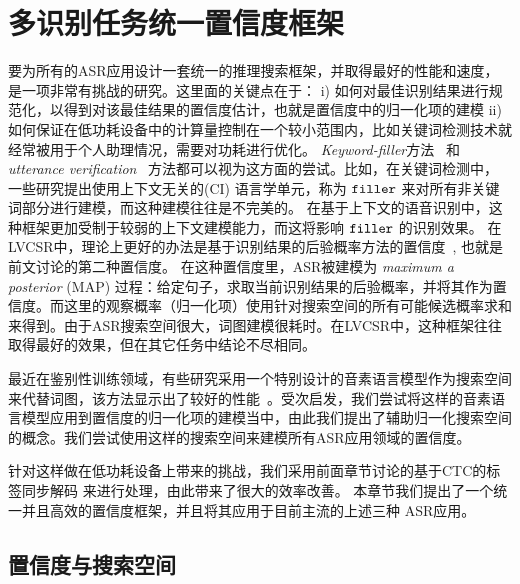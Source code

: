 
\section{多识别任务统一置信度框架}
\label{chap:unify}

要为所有的ASR应用设计一套统一的推理搜索框架，并取得最好的性能和速度，是一项非常有挑战的研究。这里面的关键点在于： i) 如何对最佳识别结果进行规范化，以得到对该最佳结果的置信度估计，也就是置信度中的归一化项的建模
    ii) 如何保证在低功耗设备中的计算量控制在一个较小范围内，比如关键词检测技术就经常被用于个人助理情况，需要对功耗进行优化。
    {\em Keyword-filler}方法~\cite{young1994detecting} 和 {\em utterance verification}~\cite{rose1995training} 方法都可以视为这方面的尝试。比如，在关键词检测中，一些研究提出使用上下文无关的(CI) 语言学单元，称为 $\tt filler$ 来对所有非关键词部分进行建模，而这种建模往往是不完美的。
    在基于上下文的语音识别中，这种框架更加受制于较弱的上下文建模能力，而这将影响 $\tt filler$ 的识别效果。
    在LVCSR中，理论上更好的办法是基于识别结果的后验概率方法的置信度~\cite{wessel2001confidence}, 也就是前文讨论的第二种置信度。 在这种置信度里，ASR被建模为  {\em maximum a posterior} (MAP) 过程：给定句子，求取当前识别结果的后验概率，并将其作为置信度。而这里的观察概率（归一化项）使用针对搜索空间的所有可能候选概率求和来得到。由于ASR搜索空间很大，词图建模很耗时。在LVCSR中，这种框架往往取得最好的效果，但在其它任务中结论不尽相同。

    最近在鉴别性训练领域，有些研究采用一个特别设计的音素语言模型作为搜索空间来代替词图，该方法显示出了较好的性能~\cite{chen2006advances}\cite{povey2016purely}。受次启发，我们尝试将这样的音素语言模型应用到置信度的归一化项的建模当中，由此我们提出了辅助归一化搜索空间的概念。我们尝试使用这样的搜索空间来建模所有ASR应用领域的置信度。 %
    
    针对这样做在低功耗设备上带来的挑战，我们采用前面章节讨论的基于CTC的标签同步解码\cite{Chen+2016} 来进行处理，由此带来了很大的效率改善。
    本章节我们提出了一个统一并且高效的置信度框架，并且将其应用于目前主流的上述三种 ASR应用。



  \subsection{置信度与搜索空间}
  \label{Sec:conf-search-space}

